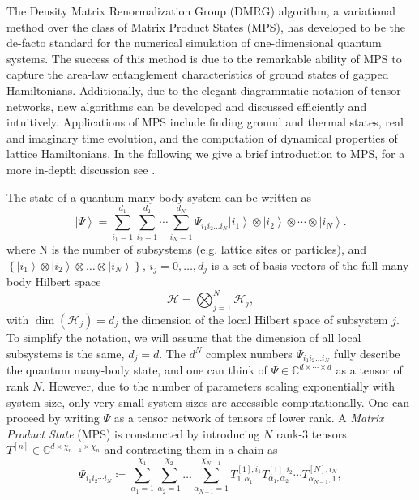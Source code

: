 The Density Matrix Renormalization Group (DMRG) algorithm, a variational method over the class of Matrix Product States (MPS), has developed to be the de-facto standard for the numerical simulation of one-dimensional quantum systems. The success of this method is due to the remarkable ability of MPS to capture the area-law entanglement characteristics of ground states of gapped Hamiltonians. Additionally, due to the elegant diagrammatic notation of tensor networks, new algorithms can be developed and discussed efficiently and intuitively. Applications of MPS include finding ground and thermal states, real and imaginary time evolution, and the computation of dynamical properties of lattice Hamiltonians. In the following we give a brief introduction to MPS, for a more in-depth discussion see \cite{cite:DMRG_in_the_age_of_MPS, cite:practical_introduction_MPS_and_PEPS, cite:tenpy}. \par
The state of a quantum many-body system can be written as
\begin{equation}
	\left|\Psi\right\rangle = \sum_{i_1=1}^{d_1} \sum_{i_2=1}^{d_2} \cdots \sum_{i_N=1}^{d_N} \Psi_{i_1i_2\dots i_N} \left|i_1\right\rangle \otimes \left|i_2\right\rangle \otimes \cdots \otimes \left|i_N\right\rangle.
\end{equation}
where N is the number of subsystems (e.g. lattice sites or particles), and $\left\{\left|i_1\right\rangle \otimes \left|i_2\right\rangle \otimes \dots \otimes \left|i_N\right\rangle\right\}$, $i_j = 0, \dots, d_j$ is a set of basis vectors of the full many-body Hilbert space
\begin{equation}
	\mathcal{H} = \bigotimes_{j=1}^{N} \mathcal{H}_j,
\end{equation}
with $\dim\left(\mathcal{H}_j\right) = d_j$ the dimension of the local Hilbert space of subsystem $j$. To simplify the notation, we will assume that the dimension of all local subsystems is the same, $d_j = d$. The $d^N$ complex numbers $\Psi_{i_1i_2\dots i_N}$ fully describe the quantum many-body state, and one can think of $\Psi\in\mathbb{C}^{d\times\cdots\times d}$ as a tensor of rank $N$. However, due to the number of parameters scaling exponentially with system size, only very small system sizes are accessible computationally. One can proceed by writing $\Psi$ as a tensor network of tensors of lower rank. A \textit{Matrix Product State} (MPS) is constructed by introducing $N$ rank-3 tensors $T^{[n]}\in\mathbb{C}^{d\times \chi_{n-1}\times \chi_{n}}$ and contracting them in a chain as
\begin{equation}
	\label{eq:MPS_open_boundary_conditions_general_definition}
	\Psi_{i_1i_2\cdots i_N} \coloneqq \sum_{\alpha_1=1}^{\chi_1} \sum_{\alpha_2=1}^{\chi_2}\dots\sum_{\alpha_{N-1}=1}^{\chi_{N-1}}T^{[1],i_1}_{1,\alpha_1} T^{[1],i_2}_{\alpha_1,\alpha_2} \cdots T^{[N],i_N}_{\alpha_{N-1},1},
\end{equation}
